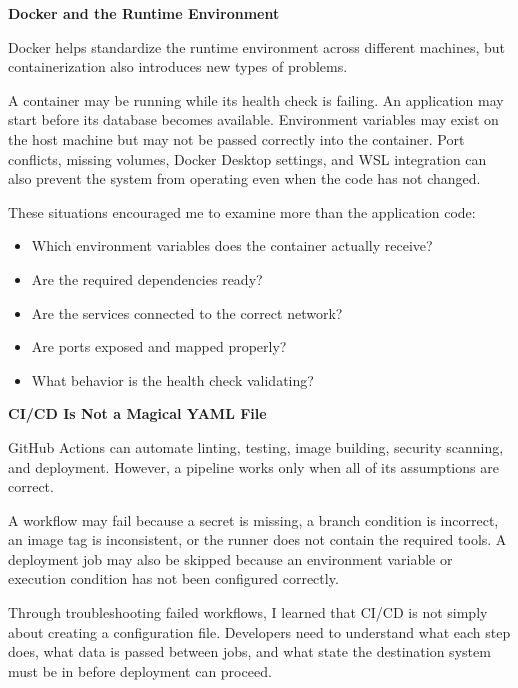 \vspace{0.5em}\noindent\textbf{Docker and the Runtime
Environment}\par

Docker helps standardize the runtime environment across different
machines, but containerization also introduces new types of problems.

A container may be running while its health check is failing. An
application may start before its database becomes available. Environment
variables may exist on the host machine but may not be passed correctly
into the container. Port conflicts, missing volumes, Docker Desktop
settings, and WSL integration can also prevent the system from operating
even when the code has not changed.

These situations encouraged me to examine more than the application
code:

\begin{itemize}
\tightlist
\item
  Which environment variables does the container actually receive?
\item
  Are the required dependencies ready?
\item
  Are the services connected to the correct network?
\item
  Are ports exposed and mapped properly?
\item
  What behavior is the health check validating?
\end{itemize}

\vspace{0.5em}\noindent\textbf{CI/CD Is Not a Magical YAML
File}\par

GitHub Actions can automate linting, testing, image building, security
scanning, and deployment. However, a pipeline works only when all of its
assumptions are correct.

A workflow may fail because a secret is missing, a branch condition is
incorrect, an image tag is inconsistent, or the runner does not contain
the required tools. A deployment job may also be skipped because an
environment variable or execution condition has not been configured
correctly.

Through troubleshooting failed workflows, I learned that CI/CD is not
simply about creating a configuration file. Developers need to
understand what each step does, what data is passed between jobs, and
what state the destination system must be in before deployment can
proceed.

